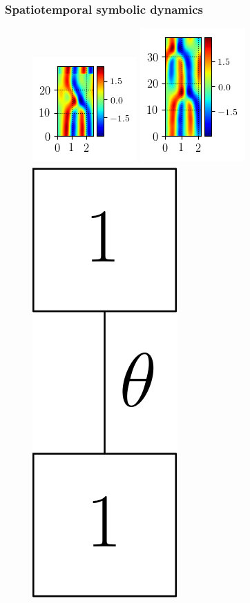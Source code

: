 \documentclass[mathserif, handout]{beamer}
\begin{document}
\begin{frame}%
  \frametitle{Spatiotemporal symbolic dynamics}
\begin{figure}
\includegraphics[width=.25\textwidth,height=.25\textheight]{MNG_HOD_init}
\includegraphics[width=.25\textwidth,height=.25\textheight]{MNG_HOD_final}
\includegraphics[width=.15\textwidth,height=.25\textheight]{MNG_symb11rot}
\end{figure}
\end{frame}
\end{document}

